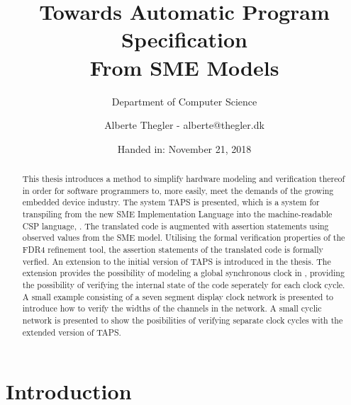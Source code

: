 \documentclass[a4paper]{report}
\author{Alberte Thegler - alberte@thegler.dk}
\title{Towards Automatic Program Specification \\ From SME Models}
\subtitle{Department of Computer Science}
\date{Handed in: November 21, 2018}
\begin{document}
\maketitle



\begin{abstract}
\begin{doublespace}
This thesis introduces a method to simplify hardware modeling and verification
thereof in order for software programmers to, more easily, meet the demands of
the growing embedded device industry. The system TAPS is presented, which is a
system for transpiling from the new SME Implementation Language into the
machine-readable CSP language, \cspm{}.
The translated \cspm{} code is augmented with assertion statements using
observed values from the SME model. Utilising the formal verification
properties of the FDR4 refinement tool, the assertion statements of the
translated \cspm{} code is formally verfied.
An extension to the initial version of TAPS is introduced in the thesis. The
extension provides the possibility of modeling a global synchronous clock in
\cspm{}, providing the possibility of verifying the internal state of the
\cspm{} code seperately for each clock cycle.
A small example consisting of a
seven segment display clock network is presented to introduce how to verify the
widths of the channels in the network. A small cyclic network is presented to
show the posibilities of verifying separate clock cycles with the extended
version of TAPS.
\end{doublespace}
\end{abstract}


\newpage
\tableofcontents

\newpage
{}



\chapter{Introduction}

%
% 
\end{document}
